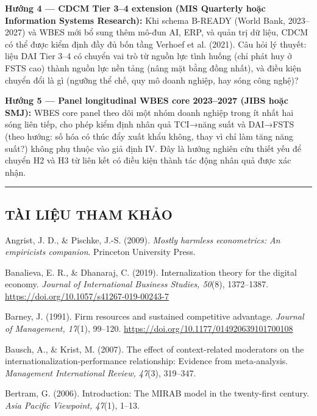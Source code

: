 \documentclass[12pt,a4paper]{article}
\begin{document}
\textbf{Hướng 4 --- CDCM Tier 3--4 extension (MIS Quarterly hoặc
Information Systems Research):} Khi schema B-READY (World Bank,
2023--2027) và WBES mới bổ sung thêm mô-đun AI, ERP, và quản trị dữ
liệu, CDCM có thể được kiểm định đầy đủ bốn tầng Verhoef et al. (2021).
Câu hỏi lý thuyết: liệu DAI Tier 3--4 có chuyển vai trò từ nguồn lực
tình huống (chỉ phát huy ở FSTS cao) thành nguồn lực nền tảng (nâng mặt
bằng đồng nhất), và điều kiện chuyển đổi là gì (ngưỡng thể chế, quy mô
doanh nghiệp, hay sóng công nghệ)?

\textbf{Hướng 5 --- Panel longitudinal WBES core 2023--2027 (JIBS hoặc
SMJ):} WBES core panel theo dõi một nhóm doanh nghiệp trong ít nhất hai
sóng liên tiếp, cho phép kiểm định nhân quả TCI→năng suất và DAI→FSTS
(theo hướng: số hóa có thúc đẩy xuất khẩu không, thay vì chỉ làm tăng
năng suất?) không phụ thuộc vào giả định IV. Đây là hướng nghiên cứu
thiết yếu để chuyển H2 và H3 từ liên kết có điều kiện thành tác động
nhân quả được xác nhận.

\begin{center}\rule{0.5\linewidth}{0.5pt}\end{center}

\hypertarget{tuxe0i-liux1ec7u-tham-khux1ea3o}{%
\subsection{TÀI LIỆU THAM KHẢO}\label{tuxe0i-liux1ec7u-tham-khux1ea3o}}

Angrist, J. D., \& Pischke, J.-S. (2009). \emph{Mostly harmless
econometrics: An empiricist\textquotesingle s companion}. Princeton
University Press.

Banalieva, E. R., \& Dhanaraj, C. (2019). Internalization theory for the
digital economy. \emph{Journal of International Business Studies,
50}(8), 1372--1387. \url{https://doi.org/10.1057/s41267-019-00243-7}

Barney, J. (1991). Firm resources and sustained competitive advantage.
\emph{Journal of Management, 17}(1), 99--120.
\url{https://doi.org/10.1177/014920639101700108}

Bausch, A., \& Krist, M. (2007). The effect of context-related
moderators on the internationalization-performance relationship:
Evidence from meta-analysis. \emph{Management International Review,
47}(3), 319--347.

Bertram, G. (2006). Introduction: The MIRAB model in the twenty-first
century. \emph{Asia Pacific Viewpoint, 47}(1), 1--13.
\end{document}
